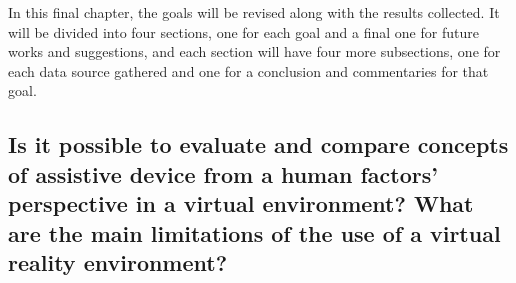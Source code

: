 



In this final chapter, the goals will be revised along with the results collected. It will be divided into four sections, one for each goal and a final one for future works and suggestions, and each section will have four more subsections, one for each data source gathered and one for a conclusion and commentaries for that goal.



\subsection*{Is it possible to evaluate and compare concepts of assistive device from a human factors’ perspective in a virtual environment? What are the main limitations of the use of a virtual reality environment?
}

